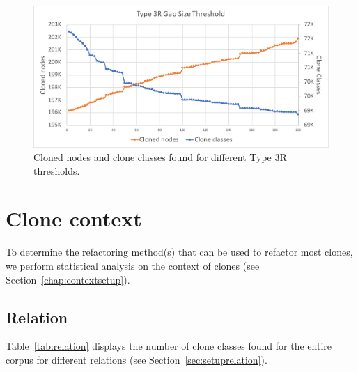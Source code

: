 \begin{figure}[H]
  \includegraphics[width=1\textwidth]{img/T3R}
  \caption{Cloned nodes and clone classes found for different Type 3R thresholds.}
  \label{fig:t3rgraph}
\end{figure}

\section{Clone context}
To determine the refactoring method(s) that can be used to refactor most clones, we perform statistical analysis on the context of clones (see Section~\ref{chap:contextsetup}).

\subsection{Relation} \label{sec:relationresults}
Table~\ref{tab:relation} displays the number of clone classes found for the entire corpus for different relations (see Section~\ref{sec:setuprelation}).

